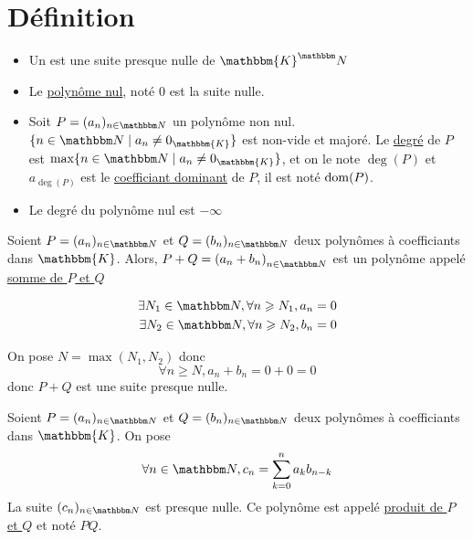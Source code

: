 \part{Définition}

\begin{defn}
	\begin{itemize}
		\item Un  est une suite presque nulle de $\mathbbm{K}^\N$\\
		\item Le \underline{polynôme nul}, noté $0$ est la suite nulle.\\
		\item Soit $P = (a_n)_{n\in\N}$ un polynôme non nul.\\
			$\{n \in \N \mid a_n \neq 0_\mathbbm{K}\}$ est non-vide et majoré. Le \underline{degré} de $P$ est $\max \{n \in \N \mid a_n \neq 0_\mathbbm{K}\}$, et on le note $\deg(P)$ et $a_{\deg(P)}$ est le \underline{coefficiant dominant} de $P$, il est noté $\operatorname*{dom}(P)$. \\
		\item Le degré du polynôme nul est $-\infty$\\
	\end{itemize}
\end{defn}

\begin{prop-defn}
	Soient $P = (a_n)_{n\in\N}$ et $Q = (b_n)_{n\in\N}$ deux polynômes à coefficiants dans $\mathbbm{K}$. Alors, $P + Q = \left( a_n + b_n \right)_{n\in\N}$ est un polynôme appelé \underline{somme de $P$ et $Q$}
\end{prop-defn}

\begin{prv}
	\begin{align*}
		\exists  N_1 \in \N, \forall n \ge N_1, a_n = 0\\
		\exists  N_2 \in \N, \forall n \ge N_2, b_n = 0\\
	\end{align*}

	On pose $N = \max(N_1, N_2)$ donc \[
	\forall n \ge N, a_n + b_n = 0 + 0 = 0
\] donc $P+Q$ est une suite presque nulle.
\end{prv}

\begin{prop-defn}
	Soient $P = (a_n)_{n\in\N}$ et $Q = (b_n)_{n\in\N}$ deux polynômes à coefficiants dans $\mathbbm{K}$. On pose \[
		\forall n \in \N, c_n = \sum_{k=0}^n a_k b_{n-k}
	\]
	La suite $(c_n)_{n\in\N}$ est presque nulle. Ce polynôme est appelé \underline{produit de $P$ et $Q$} et noté $PQ$.
\end{prop-defn}


